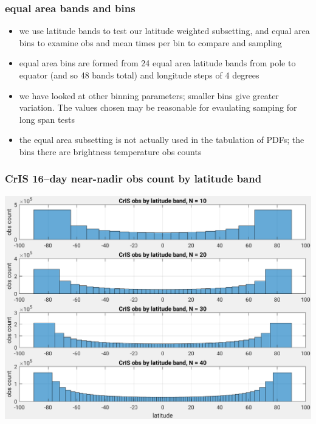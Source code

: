 \documentclass[11pt]{beamer}
\begin{document}
\begin{frame}
\frametitle{equal area bands and bins}

\begin{itemize}

  \item we use latitude bands to test our latitude weighted
    subsetting, and equal area bins to examine obs and mean times
    per bin to compare {\airs} and {\cris} sampling

  \item equal area bins are formed from 24 equal area latitude bands
    from pole to equator (and so 48 bands total) and longitude steps
    of 4 degrees

  \item we have looked at other binning parameters; smaller bins
    give greater variation.  The values chosen may be reasonable for
    evaulating samping for long span tests

  \item the equal area subsetting is not actually used in the
    tabulation of PDFs; the bins there are brightness temperature
    obs counts

\end{itemize}
\end{frame}
\begin{frame}
\frametitle{CrIS 16--day near-nadir obs count by latitude band}
\begin{center}
  \includegraphics[scale=0.5]{figures/cris_obs_by_lat_band.pdf}
\end{center}
\end{frame} %
\end{document}
